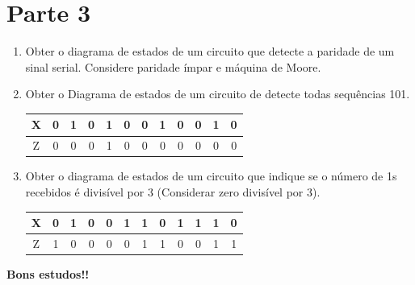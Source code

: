 \documentclass[a4paper,10pt]{article}
\begin{document}
\section{Parte 3}
\begin{enumerate}
 \item Obter o diagrama de estados de um circuito que detecte a paridade de um sinal serial. Considere paridade ímpar e máquina de Moore.
 \item Obter o Diagrama de estados de um circuito de detecte todas sequências 101.\\
  \begin{center}   
    \begin{tabular}{|c|c|c|c|c|c|c|c|c|c|c|c|}
      \hline 
	X & 0 & 1 & 0 & 1 & 0 & 0 & 1 & 0 & 0 & 1 & 0 \\
      \hline
	Z & 0 & 0 & 0 & 1 & 0 & 0 & 0 & 0 & 0 & 0 & 0 \\
      \hline      
    \end{tabular}
  \end{center}
  \item Obter o diagrama de estados de um circuito que indique se o número de 1s recebidos é divisível por 3 (Considerar zero divisível por 3).
      \begin{center}   
    \begin{tabular}{|c|c|c|c|c|c|c|c|c|c|c|c|}
      \hline 
	X & 0 & 1 & 0 & 0 & 1 & 1 & 0 & 1 & 1 & 1 & 0 \\
      \hline
	Z & 1 & 0 & 0 & 0 & 0 & 1 & 1 & 0 & 0 & 1 & 1 \\
      \hline      
    \end{tabular}
  \end{center}
\end{enumerate}

\begin{center}
  \textbf{Bons estudos!!}
\end{center}
\end{document}
